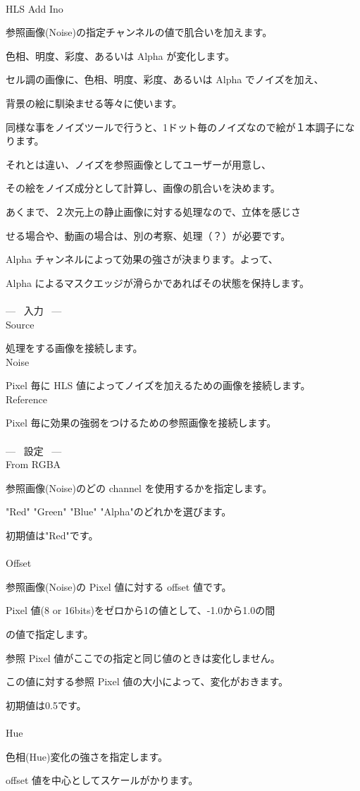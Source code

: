 \documentclass[a4paper,12pt]{article}
\begin{document}
\thispagestyle{empty}

\Large
\noindent \\
HLS Add Ino\medskip
\par
\normalsize
参照画像(Noise)の指定チャンネルの値で肌合いを加えます。\par
色相、明度、彩度、あるいは Alpha が変化します。\\
\par
セル調の画像に、色相、明度、彩度、あるいは Alpha でノイズを加え、\par
背景の絵に馴染ませる等々に使います。\par
同様な事をノイズツールで行うと、1ドット毎のノイズなので絵が１本調子になります。\par
それとは違い、ノイズを参照画像としてユーザーが用意し、\par
その絵をノイズ成分として計算し、画像の肌合いを決めます。\\
\par
あくまで、２次元上の静止画像に対する処理なので、立体を感じさ\par
せる場合や、動画の場合は、別の考察、処理（？）が必要です。\\
\par
Alpha チャンネルによって効果の強さが決まります。よって、\par
Alpha によるマスクエッジが滑らかであればその状態を保持します。\\
\\
--- \ 入力 \ ---\\
Source\par
処理をする画像を接続します。\\
Noise\par
Pixel 毎に HLS 値によってノイズを加えるための画像を接続します。\\
Reference\par
Pixel 毎に効果の強弱をつけるための参照画像を接続します。\\
\\
--- \ 設定 \ ---\\
From RGBA\par
参照画像(Noise)のどの channel を使用するかを指定します。\par
"Red" "Green" "Blue" "Alpha"のどれかを選びます。\par
初期値は"Red"です。\\
\\
Offset\par
参照画像(Noise)の Pixel 値に対する offset 値です。\par
Pixel 値(8 or 16bits)をゼロから1の値として、-1.0から1.0の間\par
の値で指定します。\par
参照 Pixel 値がここでの指定と同じ値のときは変化しません。\par
この値に対する参照 Pixel 値の大小によって、変化がおきます。\par
初期値は0.5です。\\
\\
Hue\par
色相(Hue)変化の強さを指定します。\par
offset 値を中心としてスケールがかります。
\end{document}
